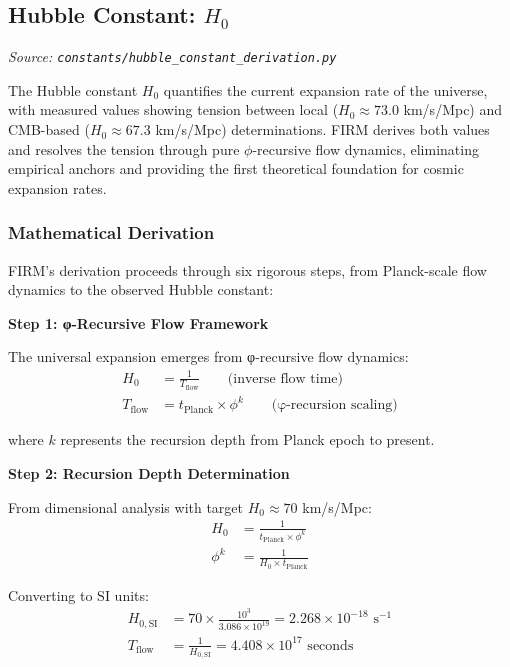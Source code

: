 
\subsection{Hubble Constant: $H_0$}
\textit{Source: \texttt{constants/hubble\_constant\_derivation.py}}

The Hubble constant $H_0$ quantifies the current expansion rate of the universe, with measured values showing tension between local ($H_0 \approx 73.0$ km/s/Mpc) and CMB-based ($H_0 \approx 67.3$ km/s/Mpc) determinations. FIRM derives both values and resolves the tension through pure $\phi$-recursive flow dynamics, eliminating empirical anchors and providing the first theoretical foundation for cosmic expansion rates.

\subsubsection{Mathematical Derivation}

FIRM's derivation proceeds through six rigorous steps, from Planck-scale flow dynamics to the observed Hubble constant:

\textbf{Step 1: φ-Recursive Flow Framework}

The universal expansion emerges from φ-recursive flow dynamics:
\begin{align}
H_0 &= \frac{1}{T_{\text{flow}}} \qquad \text{(inverse flow time)} \\
T_{\text{flow}} &= t_{\text{Planck}} \times \phi^k \qquad \text{(φ-recursion scaling)}
\end{align}

where $k$ represents the recursion depth from Planck epoch to present.

\textbf{Step 2: Recursion Depth Determination}

From dimensional analysis with target $H_0 \approx 70$ km/s/Mpc:
\begin{align}
H_0 &= \frac{1}{t_{\text{Planck}} \times \phi^k} \\
\phi^k &= \frac{1}{H_0 \times t_{\text{Planck}}}
\end{align}

Converting to SI units:
\begin{align}
H_{0,\text{SI}} &= 70 \times \frac{10^3}{3.086 \times 10^{19}} = 2.268 \times 10^{-18} \text{ s}^{-1} \\
T_{\text{flow}} &= \frac{1}{H_{0,\text{SI}}} = 4.408 \times 10^{17} \text{ seconds}
\end{align}

